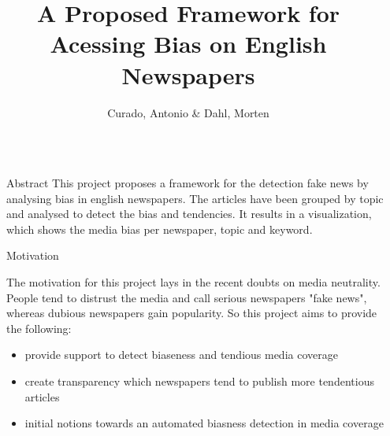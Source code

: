 \documentclass[final]{beamer}
\title{A Proposed Framework for Acessing Bias on English Newspapers {\emoji[ios]{1F4F0}}} %
\author{Curado, Antonio  \&  Dahl, Morten} %
\institute{Masters in Advanced Analytics @ Nova IMS} %
\newlength{\sepwid}
\newlength{\onecolwid}
\begin{document}

\setlength{\belowcaptionskip}{2ex} %
\setlength\belowdisplayshortskip{2ex} %

\begin{frame}[t] %

\begin{columns}[t] %

\begin{column}{\sepwid}\end{column} %

\begin{column}{\onecolwid} %



\begin{block}{Abstract}
    This project proposes a framework for the detection fake news by analysing bias in english newspapers.
    The articles have been grouped by topic and analysed to detect the bias and tendencies.
    It results in a visualization, which shows the media bias per newspaper, topic and keyword.
\end{block}



\begin{block}{Motivation}

    The motivation for this project lays in the recent doubts on media neutrality. People tend to distrust the media and call serious newspapers "fake news", whereas dubious newspapers gain popularity. So this project aims to provide the following:
    \begin{itemize}
        \item provide support to detect biaseness and tendious media coverage
        \item create transparency which newspapers tend to publish more tendentious articles
        \item initial notions towards an automated biasness detection in media coverage
    \end{itemize}


\end{block}
\end{column}
\end{columns}
\end{frame}
\end{document}
